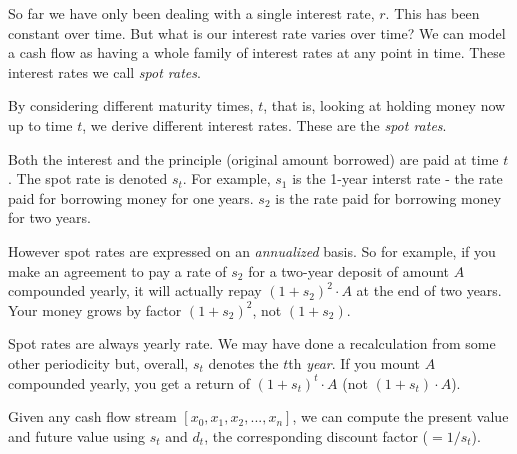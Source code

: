 So far we have only been dealing with a single 
interest rate, $r$. This has been constant over time. 
But what is our interest rate varies over time?
We can model a cash flow as having a whole 
family of interest rates at any point in time. 
These interest rates we call \textit{spot rates}.  


By considering different maturity times, $t$, that is, 
looking at holding money now up to time $t$, we derive 
different interest rates. These are the \textit{spot rates}. 

Both the interest and the principle (original amount borrowed) 
are paid at time $t$. The spot rate is denoted $s_t$. 
For example, $s_1$ is the 1-year interst rate - the rate paid for borrowing money for one years. 
$s_2$ is the rate paid for borrowing money for two years. 

However spot rates are expressed on an \textit{annualized} basis.
So for example, if you make an agreement to pay a rate of $s_2$ 
for a two-year deposit of amount $A$ compounded yearly, it 
will actually repay $(1 + s_2)^2 \cdot A$ at the end of two years. 
Your money grows by factor $(1 + s_2)^2$, not $(1 + s_2)$. 

Spot rates are always yearly rate. We may have done a recalculation from some other periodicity 
but, overall, $s_t$ denotes the $t$th \textit{year}. If you mount $A$ compounded yearly, 
you get a return of $(1 + s_t)^t \cdot A$ (not $(1 + s_t) \cdot A$). 

\begin{figure}[h]
\end{figure}


Given any cash flow stream $[x_0, x_1, x_2, ..., x_n]$, we can compute the 
present value and future value using $s_t$
and $d_t$, the corresponding discount factor ($= 1/s_t$). 



